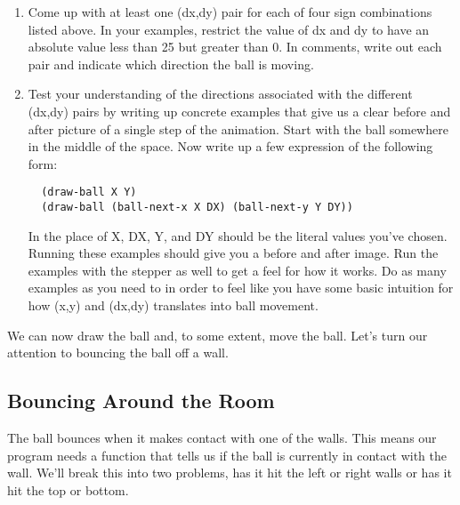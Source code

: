 \documentclass[nobib]{tufte-handout}
\begin{document}
\begin{enumerate}[resume]
  \item Come up with at least one (dx,dy) pair for each of four sign combinations listed above. In your examples, restrict the value of dx and dy to have an absolute value less than 25 but greater than 0. In comments, write out each pair and indicate which direction the ball is moving.

  \item Test your understanding of the directions associated with the different (dx,dy) pairs by writing up concrete examples that give us a clear before and after picture of a single step of the animation. Start with the ball somewhere in the middle of the space. Now write up a few expression of the following form:

  \begin{lstlisting}
  (draw-ball X Y)
  (draw-ball (ball-next-x X DX) (ball-next-y Y DY))
  \end{lstlisting}

  In the place of X, DX, Y, and DY should be the literal values you've chosen. Running these examples should give you a before and after image. Run the examples with the stepper as well to get a feel for how it works. Do as many examples as you need to in order to feel like you have some basic intuition for how (x,y) and (dx,dy) translates into ball movement.

\end{enumerate}

We can now draw the ball and, to some extent, move the ball. Let's turn our attention to bouncing the ball off a wall.

\subsection*{Bouncing Around the Room}

The ball bounces when it makes contact with one of the walls. This means our program needs a function that tells us if the ball is currently in contact with the wall. We'll break this into two problems, has it hit the left or right walls or has it hit the top or bottom.
\end{document}
